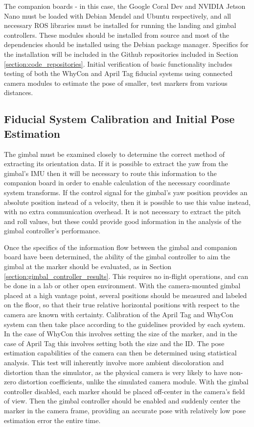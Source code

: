 The companion boards - in this case, the Google Coral Dev and NVIDIA Jetson Nano must be loaded with Debian Mendel and Ubuntu respectively, and all necessary ROS libraries must be installed for running the landing and gimbal controllers. These modules should be installed from source and most of the dependencies should be installed using the Debian package manager. Specifics for the installation will be included in the Github repositories included in Section \ref{section:code_repositories}. Initial verification of basic functionality includes testing of both the WhyCon and April Tag fiducial systems using connected camera modules to estimate the pose of smaller, test markers from various distances. 

\subsection{Fiducial System Calibration and Initial Pose Estimation}

The gimbal must be examined closely to determine the correct method of extracting its orientation data. If it is possible to extract the yaw from the gimbal's IMU then it will be necessary to route this information to the companion board in order to enable calculation of the necessary coordinate system transforms. If the control signal for the gimbal's yaw position provides an absolute position instead of a velocity, then it is possible to use this value instead, with no extra communication overhead. It is not necessary to extract the pitch and roll values, but these could provide good information in the analysis of the gimbal controller's performance.

Once the specifics of the information flow between the gimbal and companion board have been determined, the ability of the gimbal controller to aim the gimbal at the marker should be evaluated, as in Section \ref{section:gimbal_controller_results}. This requires no in-flight operations, and can be done in a lab or other open environment. With the camera-mounted gimbal placed at a high vantage point, several positions should be measured and labeled on the floor, so that their true relative horizontal positions with respect to the camera are known with certainty. Calibration of the April Tag and WhyCon system can then take place according to the guidelines provided by each system. In the case of WhyCon this involves setting the size of the marker, and in the case of April Tag this involves setting both the size and the ID. The pose estimation capabilities of the camera can then be determined using statistical analysis. This test will inherently involve more ambient discoloration and distortion than the simulator, as the physical camera is very likely to have non-zero distortion coefficients, unlike the simulated camera module. With the gimbal controller disabled, each marker should be placed off-center in the camera's field of view. Then the gimbal controller should be enabled and suddenly center the marker in the camera frame, providing an accurate pose with relatively low pose estimation error the entire time.

